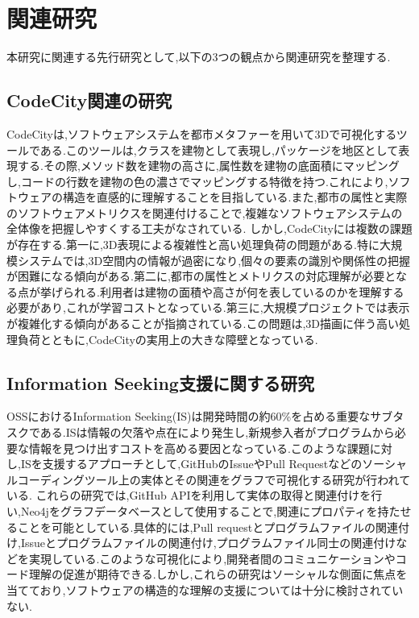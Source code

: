\documentclass[12pt,twoside]{jbook}
\begin{document}
\chapter{関連研究}
本研究に関連する先行研究として,以下の3つの観点から関連研究を整理する.

\section{CodeCity関連の研究}
CodeCityは,ソフトウェアシステムを都市メタファーを用いて3Dで可視化するツールである\cite{wettel2011software}.このツールは,クラスを建物として表現し,パッケージを地区として表現する.その際,メソッド数を建物の高さに,属性数を建物の底面積にマッピングし,コードの行数を建物の色の濃さでマッピングする特徴を持つ.これにより,ソフトウェアの構造を直感的に理解することを目指している.また,都市の属性と実際のソフトウェアメトリクスを関連付けることで,複雑なソフトウェアシステムの全体像を把握しやすくする工夫がなされている.
しかし,CodeCityには複数の課題が存在する.第一に,3D表現による複雑性と高い処理負荷の問題がある.特に大規模システムでは,3D空間内の情報が過密になり,個々の要素の識別や関係性の把握が困難になる傾向がある.第二に,都市の属性とメトリクスの対応理解が必要となる点が挙げられる.利用者は建物の面積や高さが何を表しているのかを理解する必要があり,これが学習コストとなっている.第三に,大規模プロジェクトでは表示が複雑化する傾向があることが指摘されている.この問題は,3D描画に伴う高い処理負荷とともに,CodeCityの実用上の大きな障壁となっている.

\section{Information Seeking支援に関する研究}
OSSにおけるInformation Seeking(IS)は開発時間の約60\%を占める重要なサブタスクである.\cite{kutsuzawa2016information}ISは情報の欠落や点在により発生し,新規参入者がプログラムから必要な情報を見つけ出すコストを高める要因となっている.このような課題に対し,ISを支援するアプローチとして,GitHubのIssueやPull Requestなどのソーシャルコーディングツール上の実体とその関連をグラフで可視化する研究が行われている.
これらの研究では,GitHub APIを利用して実体の取得と関連付けを行い,Neo4jをグラフデータベースとして使用することで,関連にプロパティを持たせることを可能としている.具体的には,Pull requestとプログラムファイルの関連付け,Issueとプログラムファイルの関連付け,プログラムファイル同士の関連付けなどを実現している.このような可視化により,開発者間のコミュニケーションやコード理解の促進が期待できる.しかし,これらの研究はソーシャルな側面に焦点を当てており,ソフトウェアの構造的な理解の支援については十分に検討されていない.
\end{document}
